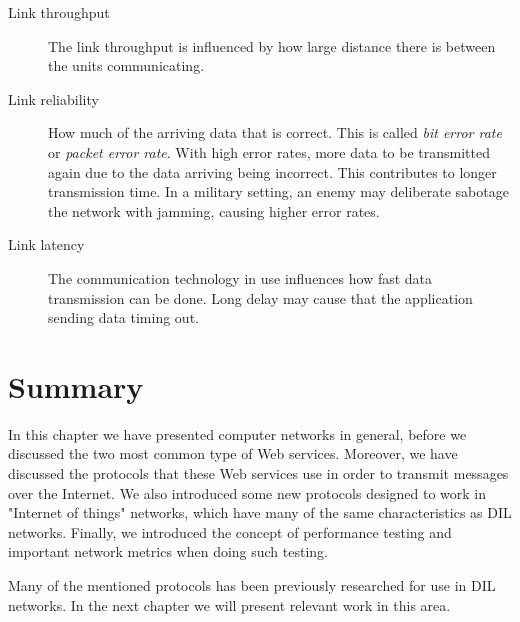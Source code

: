 \begin{description}

\item[Link throughput] The link throughput is influenced by how large distance
there is between the units communicating.

\item[Link reliability] How much of the arriving data that is correct. This is
called \textit{bit error rate} or \textit{packet error rate}. With high error
rates, more data to be transmitted again due to the data arriving being
incorrect. This contributes to longer transmission time. In a military setting,
an enemy may deliberate sabotage the network with jamming, causing higher error
rates.

\item[Link latency] The communication technology in use influences how fast data
transmission can be done. Long delay may cause that the application sending data
timing out.

\end{description}

\section{Summary}

In this chapter we have presented computer networks in general, before we
discussed the two most common type of Web services. Moreover, we have discussed
the protocols that these Web services use in order to transmit messages over the
Internet. We also introduced some new protocols designed to work in "Internet of
things" networks, which have many of the same characteristics as DIL networks.
Finally, we introduced the concept of performance testing and important network
metrics when doing such testing.

Many of the mentioned protocols has been previously researched for use in DIL
networks. In the next chapter we will present relevant work in this area.

